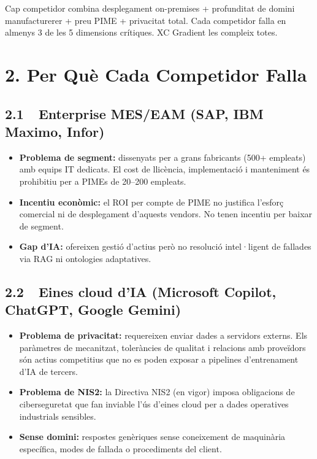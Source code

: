 \documentclass[11pt,a4paper]{article}
\begin{document}
\begin{insightbox}[title=Insight clau]
Cap competidor combina desplegament on-premises + profunditat de domini manufacturerer + preu PIME + privacitat total. Cada competidor falla en almenys 3 de les 5 dimensions crítiques. XC Gradient les compleix totes.
\end{insightbox}

\section{2. Per Què Cada Competidor Falla}

\subsection{2.1~~Enterprise MES/EAM (SAP, IBM Maximo, Infor)}

\begin{itemize}[leftmargin=1.5em,itemsep=2pt]
\item \textbf{Problema de segment:} dissenyats per a grans fabricants (500+ empleats) amb equips IT dedicats. El cost de llicència, implementació i manteniment és prohibitiu per a PIMEs de 20--200 empleats.
\item \textbf{Incentiu econòmic:} el ROI per compte de PIME no justifica l'esforç comercial ni de desplegament d'aquests vendors. No tenen incentiu per baixar de segment.
\item \textbf{Gap d'IA:} ofereixen gestió d'actius però no resolució intel·ligent de fallades via RAG ni ontologies adaptatives.
\end{itemize}

\subsection{2.2~~Eines cloud d'IA (Microsoft Copilot, ChatGPT, Google Gemini)}

\begin{itemize}[leftmargin=1.5em,itemsep=2pt]
\item \textbf{Problema de privacitat:} requereixen enviar dades a servidors externs. Els paràmetres de mecanitzat, toleràncies de qualitat i relacions amb proveïdors són actius competitius que no es poden exposar a pipelines d'entrenament d'IA de tercers.
\item \textbf{Problema de NIS2:} la Directiva NIS2 (en vigor) imposa obligacions de ciberseguretat que fan inviable l'ús d'eines cloud per a dades operatives industrials sensibles.
\item \textbf{Sense domini:} respostes genèriques sense coneixement de maquinària específica, modes de fallada o procediments del client.
\end{itemize}
\end{document}
